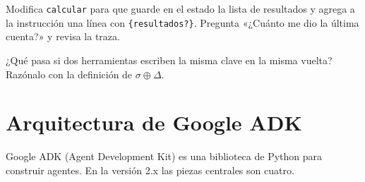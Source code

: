 \documentclass[11pt,letterpaper,oneside]{report}
\begin{document}
\begin{ejercicio}
Modifica \texttt{calcular} para que guarde en el estado la lista de resultados y agrega a la instrucción una línea con \texttt{\{resultados?\}}. Pregunta «¿Cuánto me dio la última cuenta?» y revisa la traza.
\end{ejercicio}

\begin{ejercicio}
¿Qué pasa si dos herramientas escriben la misma clave en la misma vuelta? Razónalo con la definición de $\sigma\oplus\Delta$.
\end{ejercicio}

\section{Arquitectura de Google ADK}

Google ADK (Agent Development Kit) es una biblioteca de Python para construir agentes. En la versión 2.x las piezas centrales son cuatro.
\end{document}
